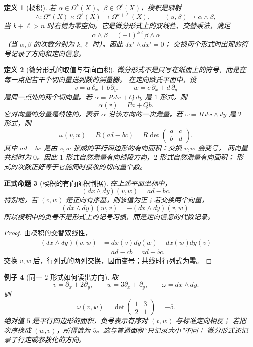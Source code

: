 \documentclass[UTF8,fontset=none,a4paper,11pt]{ctexart}
\theoremstyle{foundation-definition}
\newtheorem{definition}{定义}[section]
\theoremstyle{foundation-theorem}
\theoremstyle{foundation-proposition}
\newtheorem{proposition}[definition]{正式命题}
\theoremstyle{foundation-example}
\newtheorem{example}[definition]{例子}
\theoremstyle{foundation-remark}
\theoremstyle{foundation-theorem}
\begin{document}
\begin{definition}[楔积]\label{def:wedge-product}
若 \(\alpha\in\Omega^k(X)\)、\(\beta\in\Omega^\ell(X)\)，楔积是映射
\[
\wedge:\Omega^k(X)\times\Omega^\ell(X)\longrightarrow\Omega^{k+\ell}(X),
\qquad (\alpha,\beta)\longmapsto\alpha\wedge\beta,
\]
当 \(k+\ell>n\) 时右侧为零空间。它是微分形式上的双线性、交替乘法，满足
\[
\alpha\wedge\beta=(-1)^{k\ell}\beta\wedge\alpha
\]
（当 \(\alpha,\beta\) 的次数分别为 \(k,\ell\) 时）。因此 \(dx^i\wedge dx^i=0\)；
交换两个形式时出现的符号记录了方向和定向信息。
\end{definition}

\begin{definition}[微分形式的取值与有向面积]\label{def:form-evaluation}
微分形式不是只写在纸面上的符号，而是在每一点把若干个切向量送到数的测量器。
在定向欧氏平面中，设
\[
 v=a\,\partial_x+b\,\partial_y,\qquad
 w=c\,\partial_x+d\,\partial_y
\]
是同一点处的两个切向量。若
\(\alpha=P\,dx+Q\,dy\) 是 \(1\)-形式，则
\[
\alpha(v)=Pa+Qb.
\]
它对向量的分量是线性的，表示 \(\alpha\) 沿该方向的一次测量。若
\(\omega=R\,dx\wedge dy\) 是 \(2\)-形式，则
\[
\omega(v,w)=R(ad-bc)
 =R\det\begin{pmatrix}a&c\\ b&d\end{pmatrix}.
\]
其中 \(ad-bc\) 是由 \(v,w\) 张成的平行四边形的有向面积：交换 \(v,w\) 会变号，
两向量共线时为 \(0\)。因此 \(1\)-形式自然测量有向线段方向，\(2\)-形式自然测量有向面积；
形式的次数正好等于它能同时接收的切向量个数。
\end{definition}

\begin{proposition}[楔积的有向面积判据]\label{prop:wedge-signed-area}
在上述平面坐标中，
\[
(dx\wedge dy)(v,w)=ad-bc.
\]
特别地，若 \((v,w)\) 是正向有序基，则该值为正；若交换两个向量，
\[
(dx\wedge dy)(w,v)=-(dx\wedge dy)(v,w).
\]
所以楔积中的负号不是形式上的记号习惯，而是定向信息的代数记录。
\end{proposition}

\begin{proof}
由楔积的交替双线性，
\[
\begin{aligned}
(dx\wedge dy)(v,w)
&=dx(v)dy(w)-dx(w)dy(v)\\
&=a d-c b=ad-bc.
\end{aligned}
\]
交换 \(v,w\) 后，行列式的两列交换，因而变号；共线时行列式为零。
\end{proof}

\begin{example}[同一 \(2\)-形式如何读出方向]\label{ex:form-evaluation-area}
取
\[
v=\partial_x+2\partial_y,\qquad
w=3\partial_x+\partial_y,\qquad
\omega=dx\wedge dy.
\]
则
\[
\omega(v,w)=
\det\begin{pmatrix}1&3\\2&1\end{pmatrix}
=-5.
\]
绝对值 \(5\) 是平行四边形的面积，负号表示有序对 \((v,w)\) 与标准定向相反；
若把次序换成 \((w,v)\)，所得值为 \(5\)。这与普通面积“只记录大小”不同：
微分形式还记录了行走或参数化的方向。
\end{example}
\end{document}
